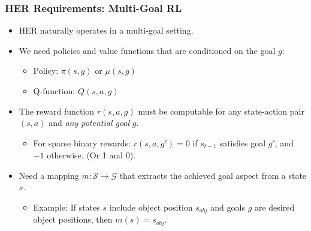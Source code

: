 \documentclass[9pt, aspectratio=169]{beamer}
\begin{document}
\begin{frame}
  \frametitle{HER Requirements: Multi-Goal RL}
    \begin{itemize}
        \item HER naturally operates in a multi-goal setting.
        \item We need policies and value functions that are conditioned on the goal $g$:
        \begin{itemize}
            \item Policy: $\pi(s, g)$ or $\mu(s, g)$
            \item Q-function: $Q(s, a, g)$
        \end{itemize}
        \item The reward function $r(s, a, g)$ must be computable for any state-action pair $(s, a)$ and \textit{any potential goal} $g$.
            \begin{itemize}
                \item For sparse binary rewards: $r(s, a, g') = 0$ if $s_{t+1}$ satisfies goal $g'$, and $-1$ otherwise. (Or 1 and 0).
            \end{itemize}

        \item Need a mapping $m: \mathcal{S} \to \mathcal{G}$ that extracts the achieved goal aspect from a state $s$.
            \begin{itemize}
                \item Example: If states $s$ include object position $s_{obj}$ and goals $g$ are desired object positions, then $m(s) = s_{obj}$.
            \end{itemize}
    \end{itemize}
\end{frame}
\end{document}
